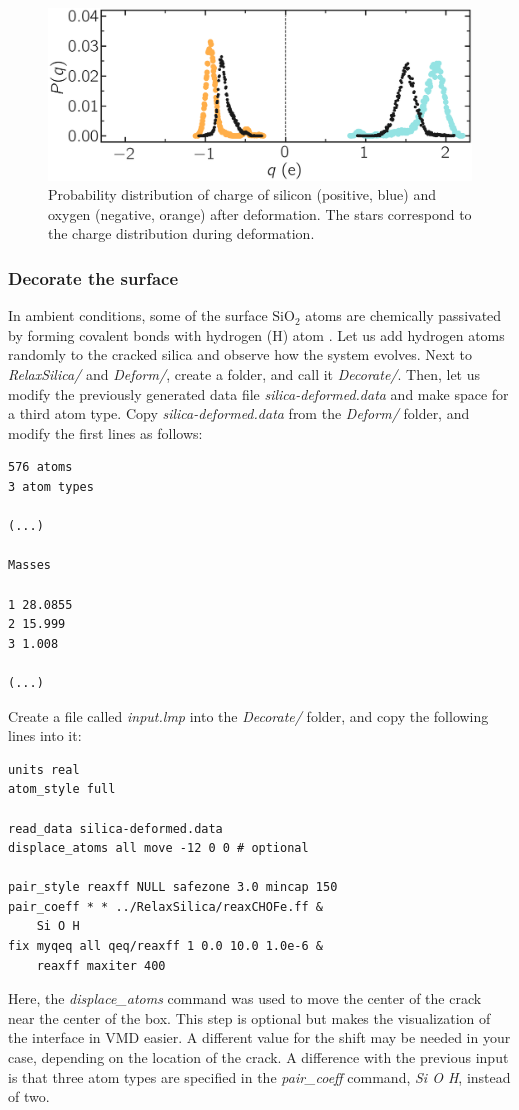 \documentclass[9pt,tutorial]{livecoms}
\begin{document}
\begin{figure}
\includegraphics[width=\linewidth]{SIO-distribution-bis}
\caption{Probability distribution of charge of silicon (positive, blue) and oxygen
(negative, orange) after deformation. The stars correspond to the charge distribution
during deformation.}
\label{fig:SIO-distribution-bis}
\end{figure}

\subsubsection{Decorate the surface}
In ambient conditions, some of the surface $\text{SiO}_2$ atoms are chemically
passivated by forming covalent bonds with hydrogen (H) atom \cite{sulpizi2012silica}.
Let us add hydrogen atoms randomly to the cracked silica and observe how the
system evolves.  Next to \textit{RelaxSilica/} and \textit{Deform/}, create a folder,
and call it \textit{Decorate/}. Then, let us modify the previously generated data
file \textit{silica-deformed.data} and make space for a third atom type.
Copy \textit{silica-deformed.data} from the \textit{Deform/} folder, and modify
the first lines as follows:
{\normalsize \begin{verbatim}
576 atoms
3 atom types

(...)

Masses

1 28.0855
2 15.999
3 1.008

(...)
\end{verbatim}}
Create a file called \textit{input.lmp} into the \textit{Decorate/} folder, and
copy the following lines into it:
{\normalsize \begin{verbatim}
units real
atom_style full

read_data silica-deformed.data
displace_atoms all move -12 0 0 # optional

pair_style reaxff NULL safezone 3.0 mincap 150
pair_coeff * * ../RelaxSilica/reaxCHOFe.ff &
    Si O H
fix myqeq all qeq/reaxff 1 0.0 10.0 1.0e-6 &
    reaxff maxiter 400
\end{verbatim}}
Here, the \textit{displace\_atoms} command was used to move the center of the
crack near the center of the box. This step is optional but makes the visualization
of the interface in VMD easier. A different value for the shift may be needed in
your case, depending on the location of the crack. A difference with the previous
input is that three atom types are specified in the \textit{pair\_coeff} command,
\textit{Si O H}, instead of two.
\end{document}
